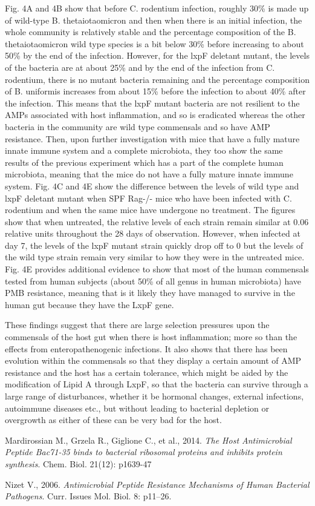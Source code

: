 Fig. 4A and 4B show that before C. rodentium infection, roughly 30\% is made up of wild-type B. thetaiotaomicron and then when there is an initial infection, the whole community is relatively stable and the percentage composition of the B. thetaiotaomicron wild type species is a bit below 30\% before increasing to about 50\% by the end of the infection. However, for the lxpF deletant mutant, the levels of the bacteria are at about 25\% and by the end of the infection from C. rodentium, there is no mutant bacteria remaining and the percentage composition of B. uniformis increases from about 15\% before the infection to about 40\% after the infection. This means that the lxpF mutant bacteria are not resilient to the AMPs associated with host inflammation, and so is eradicated whereas the other bacteria in the community are wild type commensals and so have AMP resistance. Then, upon further investigation with mice that have a fully mature innate immune system and a complete microbiota, they too show the same results of the previous experiment which has a part of the complete human microbiota, meaning that the mice do not have a fully mature innate immune system. Fig. 4C and 4E show the difference between the levels of wild type and lxpF deletant mutant when SPF Rag-/- mice who have been infected with C. rodentium and when the same mice have undergone no treatment. The figures show that when untreated, the relative levels of each strain remain similar at 0.06 relative units throughout the 28 days of observation. However, when infected at day 7, the levels of the lxpF mutant strain quickly drop off to 0 but the levels of the wild type strain remain very similar to how they were in the untreated mice. Fig. 4E provides additional evidence to show that most of the human commensals tested from human subjects (about 50\% of all genus in human microbiota) have PMB resistance, meaning that is it likely they have managed to survive in the human gut because they have the LxpF gene.

These findings suggest that there are large selection pressures upon the commensals of the host gut when there is host inflammation; more so than the effects from enteropathenogenic infections. It also shows that there has been evolution within the commensals so that they display a certain amount of AMP resistance and the host has a certain tolerance, which might be aided by the modification of Lipid A through LxpF, so that the bacteria can survive through a large range of disturbances, whether it be hormonal changes, external infections, autoimmune diseases etc., but without leading to bacterial depletion or overgrowth as either of these can be very bad for the host.

\begin{thebibliography}{9}
Mardirossian M., Grzela R., Giglione C., et al., 2014.
\textit{The Host Antimicrobial Peptide Bac71-35 binds to bacterial ribosomal proteins and inhibits protein synthesis}.
Chem. Biol. 21(12): p1639-47

Nizet V., 2006.
\textit{Antimicrobial Peptide Resistance Mechanisms of Human Bacterial Pathogens}.
Curr. Issues Mol. Biol. 8: p11–26.
\end{thebibliography}

